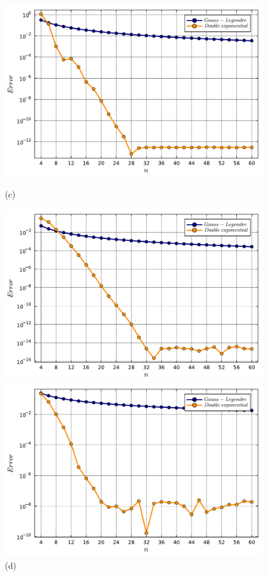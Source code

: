 \documentclass[letterpaper, 12pt]{article}
\numberwithin{equation}{section}    %
\begin{document}
\begin{figure}[!ht]
    \begin{minipage}[b]{0.47\textwidth}
        \includegraphics[width=\textwidth]{5433.pdf}
        \caption*{(c)}
    \end{minipage}
    \begin{minipage}[b]{0.47\textwidth}
        \includegraphics[width=\textwidth]{5434.pdf}
        \caption*{(d)}
    \end{minipage}
    \begin{minipage}[b]{0.47\textwidth}
        \includegraphics[width=\textwidth]{5435.pdf}

\end{minipage}
\end{figure}
\end{document}
